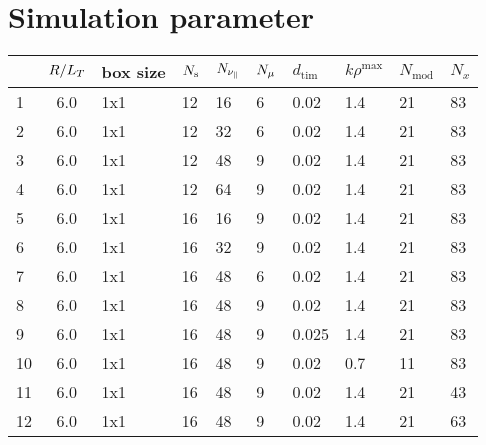 \section{Simulation parameter}
\label{append:data}

\begin{center}
    \captionsetup{type=table}
    \begin{tabular}{l | c | l | l l l l l l l}
            & $R/L_T$ & box size  & $N_\mathrm{s}$ & $N_{\nu_\parallel}$ & $N_\mu$ & $d_\mathrm{tim}$ & $k\rho^\mathrm{max}$ & $N_\mathrm{mod}$ & $N_x$ \\ \hline 
        1   & 6.0    & 1x1       & 12    & 16       & 6      & 0.02             & 1.4                  & 21               & 83    \\ 
        2   & 6.0    & 1x1       & 12    & 32       & 6      & 0.02             & 1.4                  & 21               & 83    \\ 
        3   & 6.0    & 1x1       & 12    & 48       & 9      & 0.02             & 1.4                  & 21               & 83    \\ 
        4   & 6.0    & 1x1       & 12    & 64       & 9      & 0.02             & 1.4                  & 21               & 83    \\ 
        5   & 6.0    & 1x1       & 16    & 16       & 9      & 0.02             & 1.4                  & 21               & 83    \\ 
        6   & 6.0    & 1x1       & 16    & 32       & 9      & 0.02             & 1.4                  & 21               & 83    \\ 
        7   & 6.0    & 1x1       & 16    & 48       & 6      & 0.02             & 1.4                  & 21               & 83    \\ 
        8   & 6.0    & 1x1       & 16    & 48       & 9      & 0.02             & 1.4                  & 21               & 83    \\ 
        9   & 6.0    & 1x1       & 16    & 48       & 9      & 0.025            & 1.4                  & 21               & 83    \\ 
        10  & 6.0    & 1x1       & 16    & 48       & 9      & 0.02             & 0.7                  & 11               & 83    \\ 
        11  & 6.0    & 1x1       & 16    & 48       & 9      & 0.02             & 1.4                  & 21               & 43    \\ 
        12  & 6.0    & 1x1       & 16    & 48       & 9      & 0.02             & 1.4                  & 21               & 63    \\ 

\end{tabular}
\end{center}
